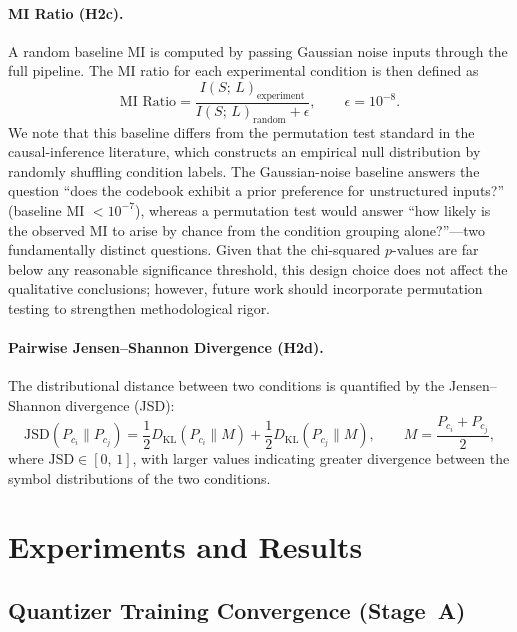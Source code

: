 \documentclass{article}
\begin{document}
\paragraph{MI Ratio (H2c).}
A random baseline MI is computed by passing Gaussian noise inputs through the
full pipeline.  The MI ratio for each experimental condition is then defined as
%
\begin{equation}
  \text{MI Ratio}
  = \frac{I(S;\,L)_{\text{experiment}}}
         {I(S;\,L)_{\text{random}} + \epsilon},
  \qquad \epsilon = 10^{-8}.
\end{equation}
%
We note that this baseline differs from the permutation test standard in the
causal-inference literature, which constructs an empirical null distribution by
randomly shuffling condition labels.  The Gaussian-noise baseline answers the
question ``does the codebook exhibit a prior preference for unstructured
inputs?'' (baseline MI $< 10^{-7}$), whereas a permutation test would answer
``how likely is the observed MI to arise by chance from the condition grouping
alone?''---two fundamentally distinct questions.  Given that the chi-squared
$p$-values are far below any reasonable significance threshold, this design
choice does not affect the qualitative conclusions; however, future work should
incorporate permutation testing to strengthen methodological rigor.

\paragraph{Pairwise Jensen--Shannon Divergence (H2d).}
The distributional distance between two conditions is quantified by the
Jensen--Shannon divergence (JSD):
%
\begin{equation}
  \mathrm{JSD}(P_{c_i} \| P_{c_j})
  = \frac{1}{2}D_{\mathrm{KL}}(P_{c_i} \| M)
  + \frac{1}{2}D_{\mathrm{KL}}(P_{c_j} \| M),
  \qquad
  M = \frac{P_{c_i} + P_{c_j}}{2},
\end{equation}
%
where $\mathrm{JSD} \in [0,\,1]$, with larger values indicating greater
divergence between the symbol distributions of the two conditions.
\section{Experiments and Results} \label{sec:experiments}
\subsection{Quantizer Training Convergence (Stage~A)}
\end{document}
